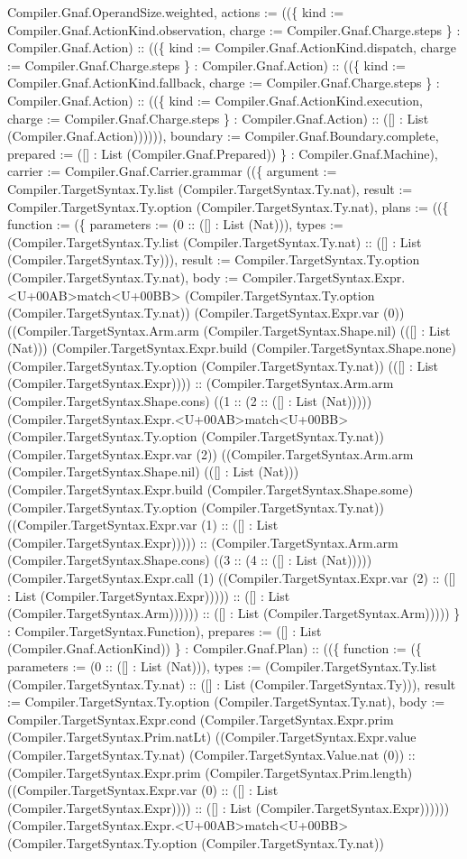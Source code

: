 \documentclass[11pt]{article}
\begin{document}
Compiler.Gnaf.OperandSize.weighted, actions := ((\{ kind := Compiler.Gnaf.ActionKind.observation, charge := Compiler.Gnaf.Charge.steps \} : Compiler.Gnaf.Action) :: ((\{ kind := Compiler.Gnaf.ActionKind.dispatch, charge := Compiler.Gnaf.Charge.steps \} : Compiler.Gnaf.Action) :: ((\{ kind := Compiler.Gnaf.ActionKind.fallback, charge := Compiler.Gnaf.Charge.steps \} : Compiler.Gnaf.Action) :: ((\{ kind := Compiler.Gnaf.ActionKind.execution, charge := Compiler.Gnaf.Charge.steps \} : Compiler.Gnaf.Action) :: ([] : List (Compiler.Gnaf.Action)))))), boundary := Compiler.Gnaf.Boundary.complete, prepared := ([] : List (Compiler.Gnaf.Prepared)) \} : Compiler.Gnaf.Machine), carrier := Compiler.Gnaf.Carrier.grammar ((\{ argument := Compiler.TargetSyntax.Ty.list (Compiler.TargetSyntax.Ty.nat), result := Compiler.TargetSyntax.Ty.option (Compiler.TargetSyntax.Ty.nat), plans := ((\{ function := (\{ parameters := (0 :: ([] : List (Nat))), types := (Compiler.TargetSyntax.Ty.list (Compiler.TargetSyntax.Ty.nat) :: ([] : List (Compiler.TargetSyntax.Ty))), result := Compiler.TargetSyntax.Ty.option (Compiler.TargetSyntax.Ty.nat), body := Compiler.TargetSyntax.Expr.<U+00AB>match<U+00BB> (Compiler.TargetSyntax.Ty.option (Compiler.TargetSyntax.Ty.nat)) (Compiler.TargetSyntax.Expr.var (0)) ((Compiler.TargetSyntax.Arm.arm (Compiler.TargetSyntax.Shape.nil) (([] : List (Nat))) (Compiler.TargetSyntax.Expr.build (Compiler.TargetSyntax.Shape.none) (Compiler.TargetSyntax.Ty.option (Compiler.TargetSyntax.Ty.nat)) (([] : List (Compiler.TargetSyntax.Expr)))) :: (Compiler.TargetSyntax.Arm.arm (Compiler.TargetSyntax.Shape.cons) ((1 :: (2 :: ([] : List (Nat))))) (Compiler.TargetSyntax.Expr.<U+00AB>match<U+00BB> (Compiler.TargetSyntax.Ty.option (Compiler.TargetSyntax.Ty.nat)) (Compiler.TargetSyntax.Expr.var (2)) ((Compiler.TargetSyntax.Arm.arm (Compiler.TargetSyntax.Shape.nil) (([] : List (Nat))) (Compiler.TargetSyntax.Expr.build (Compiler.TargetSyntax.Shape.some) (Compiler.TargetSyntax.Ty.option (Compiler.TargetSyntax.Ty.nat)) ((Compiler.TargetSyntax.Expr.var (1) :: ([] : List (Compiler.TargetSyntax.Expr))))) :: (Compiler.TargetSyntax.Arm.arm (Compiler.TargetSyntax.Shape.cons) ((3 :: (4 :: ([] : List (Nat))))) (Compiler.TargetSyntax.Expr.call (1) ((Compiler.TargetSyntax.Expr.var (2) :: ([] : List (Compiler.TargetSyntax.Expr))))) :: ([] : List (Compiler.TargetSyntax.Arm)))))) :: ([] : List (Compiler.TargetSyntax.Arm))))) \} : Compiler.TargetSyntax.Function), prepares := ([] : List (Compiler.Gnaf.ActionKind)) \} : Compiler.Gnaf.Plan) :: ((\{ function := (\{ parameters := (0 :: ([] : List (Nat))), types := (Compiler.TargetSyntax.Ty.list (Compiler.TargetSyntax.Ty.nat) :: ([] : List (Compiler.TargetSyntax.Ty))), result := Compiler.TargetSyntax.Ty.option (Compiler.TargetSyntax.Ty.nat), body := Compiler.TargetSyntax.Expr.cond (Compiler.TargetSyntax.Expr.prim (Compiler.TargetSyntax.Prim.natLt) ((Compiler.TargetSyntax.Expr.value (Compiler.TargetSyntax.Ty.nat) (Compiler.TargetSyntax.Value.nat (0)) :: (Compiler.TargetSyntax.Expr.prim (Compiler.TargetSyntax.Prim.length) ((Compiler.TargetSyntax.Expr.var (0) :: ([] : List (Compiler.TargetSyntax.Expr)))) :: ([] : List (Compiler.TargetSyntax.Expr)))))) (Compiler.TargetSyntax.Expr.<U+00AB>match<U+00BB> (Compiler.TargetSyntax.Ty.option (Compiler.TargetSyntax.Ty.nat)) 
\end{document}
